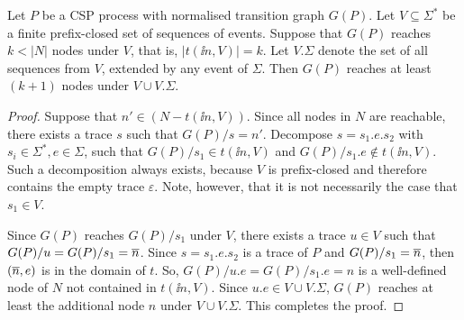 \begin{lemma}
\label{lemma:extendV} Let $P$ be a CSP process with normalised transition
graph $G(P)$. 
Let
$V\subseteq\Sigma^*$ be a finite prefix-closed set of sequences of events.
Suppose that  $G(P)$ reaches $k < |N|$ nodes under $V$, that is, $|t(\ii
n,V)| = k$. Let $V.\Sigma$ denote the set of all sequences from $V$, extended
by any event of $\Sigma$. Then $G(P)$ reaches at least $(k+1)$ nodes under
$V\cup V.\Sigma$.
\end{lemma}
\begin{proof}
Suppose that $n'\in (N - t(\ii n,V))$.  Since all nodes in $N$ are reachable,
there exists a trace $s$ such that $G(P)/s = n'$. Decompose $s = s_1.e.s_2$
with $s_i\in\Sigma^*, e\in\Sigma$, such that $G(P)/s_1 \in t(\ii n,V)$ and
$G(P)/s_1.e \not\in t(\ii n,V)$. Such a decomposition always exists, because
$V$ is prefix-closed and therefore contains the empty trace $\varepsilon$.
Note, however, that it is not necessarily the case that $s_1\in V$.

Since $G(P)$ reaches $G(P)/s_1$ under $V$, there exists a trace $u\in V$ such
that $G(P)/u = G(P)/s_1 = \overline n$. Since $s = s_1.e.s_2$ is a trace of $P$ and
$G(P)/s_1 = \overline n$, then $(\overline n,e)$ is in the domain of $t$. So, $ G(P)/u.e
= G(P)/s_1.e = n$ is a well-defined node of $N$ not contained in $t(\ii
n,V)$. Since $u.e\in V\cup V.\Sigma$, $G(P)$ reaches at least the additional
node $n$ under $V\cup V.\Sigma$. This completes the proof. \xbox
\end{proof}






